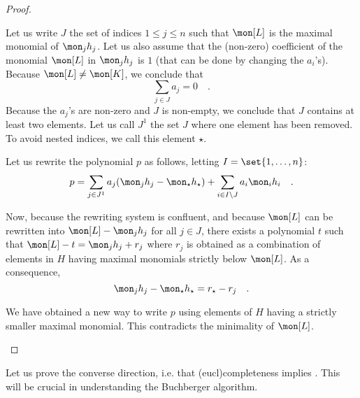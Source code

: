 \begin{proof}
\begin{description}
            Let us write $J$ the set of indices $1 \leq j \leq n$
            such that $\mon[L]$ is the maximal monomial
            of $\mon_j h_j$. Let us also assume that the
            (non-zero) coefficient of the monomial $\mon[L]$
            in $\mon_j h_j$ is $1$ (that can be done by changing
            the $a_i$'s).
            Because $\mon[L] \neq \mon[K]$,
            we conclude that
            \begin{equation}
                \sum_{j \in J}
                a_j = 0 \quad .
            \end{equation}
            Because the $a_j$'s are non-zero and
            $J$ is non-empty, we conclude that $J$ contains at least two 
            elements. Let us call
            $J^1$ the set $J$ where one element has been 
            removed. To avoid nested indices, we call this
            element $\star$.

            Let us rewrite the polynomial $p$
            as follows, letting $I = \set{ 1, \dots, n}$:
            \begin{equation}
                p = \sum_{j \in J^1} a_j (\mon_j h_j - \mon_\star h_\star)
                  + 
                    \sum_{i \in I \setminus J} a_i \mon_i h_i
                  \quad .
            \end{equation}

            Now, because the rewriting system is confluent,
            and because
            $\mon[L]$
            can be rewritten into 
            $\mon[L] - \mon_j h_j$
            for all $j \in J$,
            there exists a polynomial $t$ such that
            $\mon[L] - t = 
            \mon_j h_j +  r_j$ where $r_j$ is obtained as a combination of elements 
                    in $H$ having maximal monomials strictly below $\mon[L]$.
            As a consequence,
            \begin{equation*}
                \mon_j h_j - 
                \mon_\star h_\star
                =
                r_\star
                -
                r_j
                \quad .
            \end{equation*}

            We have obtained a new way to write $p$
            using elements of $H$ having a strictly
            smaller maximal monomial. This contradicts
            the minimality of $\mon[L]$.
    \end{description}
\end{proof}

Let us prove the converse direction, i.e. that \kl(eucl){completeness}
implies . This will be crucial in understanding the
Buchberger algorithm.

